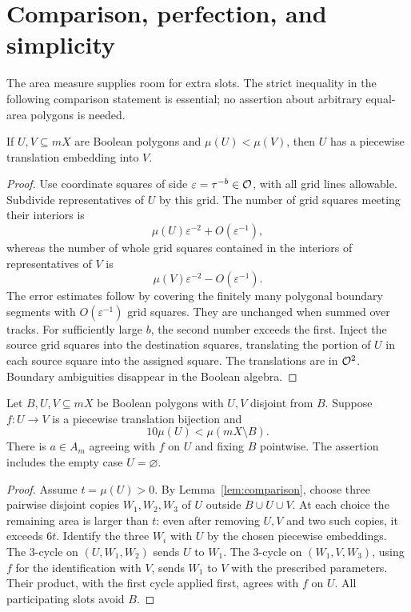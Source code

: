 \section{Comparison, perfection, and simplicity}\label{sec:simplicity}

The area measure supplies room for extra slots. The strict inequality
in the following comparison statement is essential; no assertion
about arbitrary equal-area polygons is needed.

\begin{lemma}\label{lem:comparison}
If $U,V\subseteq mX$ are Boolean polygons and $\mu(U)<\mu(V)$,
then $U$ has a piecewise translation embedding into $V$.
\end{lemma}

\begin{proof}
Use coordinate squares of side $\varepsilon=\tau^{-b}\in\mathcal O$,
with all grid lines allowable. Subdivide representatives of $U$
by this grid. The number of grid squares meeting their interiors is
\[
 \mu(U)\varepsilon^{-2}+O(\varepsilon^{-1}),
\]
whereas the number of whole grid squares contained in the interiors
of representatives of $V$ is
\[
 \mu(V)\varepsilon^{-2}-O(\varepsilon^{-1}).
\]
The error estimates follow by covering the finitely many polygonal
boundary segments with $O(\varepsilon^{-1})$ grid squares. They are
unchanged when summed over tracks. For sufficiently large $b$, the
second number exceeds the first. Inject the source grid squares into
the destination squares, translating the portion of $U$ in each
source square into the assigned square. The translations are in
$\mathcal O^2$. Boundary ambiguities disappear in the Boolean algebra.
\end{proof}

\begin{lemma}\label{lem:extension}
Let $B,U,V\subseteq mX$ be Boolean polygons with $U,V$ disjoint
from $B$. Suppose $f:U\to V$ is a piecewise translation bijection
and
\[
 10\mu(U)<\mu(mX\setminus B).
\]
There is $a\in A_m$ agreeing with $f$ on $U$ and fixing $B$
pointwise. The assertion includes the empty case $U=\varnothing$.
\end{lemma}

\begin{proof}
Assume $t=\mu(U)>0$. By Lemma~\ref{lem:comparison}, choose three
pairwise disjoint copies $W_1,W_2,W_3$ of $U$ outside $B\cup U\cup V$.
At each choice the remaining area is larger than $t$: even after
removing $U,V$ and two such copies, it exceeds $6t$.
Identify the three $W_i$ with $U$ by the chosen piecewise embeddings.
The $3$-cycle on $(U,W_1,W_2)$ sends $U$ to $W_1$.
The $3$-cycle on $(W_1,V,W_3)$, using $f$ for the identification with
$V$, sends $W_1$ to $V$ with the prescribed parameters. Their product,
with the first cycle applied first, agrees with $f$ on $U$.
All participating slots avoid $B$.
\end{proof}

